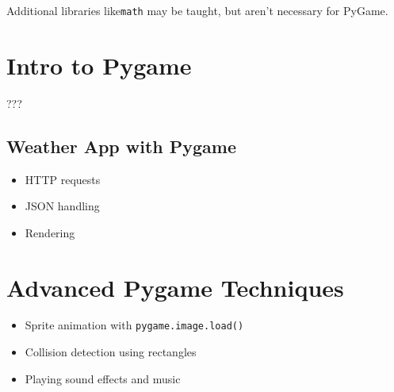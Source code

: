 \documentclass{article}
\begin{document}
Additional libraries like\verb|math| may be taught, but aren't necessary for PyGame.

\section{Intro to Pygame}
???

\subsection{Weather App with Pygame}
\begin{itemize}
    \item HTTP requests
    \item JSON handling
    \item Rendering
\end{itemize}

\section{Advanced Pygame Techniques}
\begin{itemize}
    \item Sprite animation with \verb|pygame.image.load()|
    \item Collision detection using rectangles
    \item Playing sound effects and music
\end{itemize}
\end{document}
